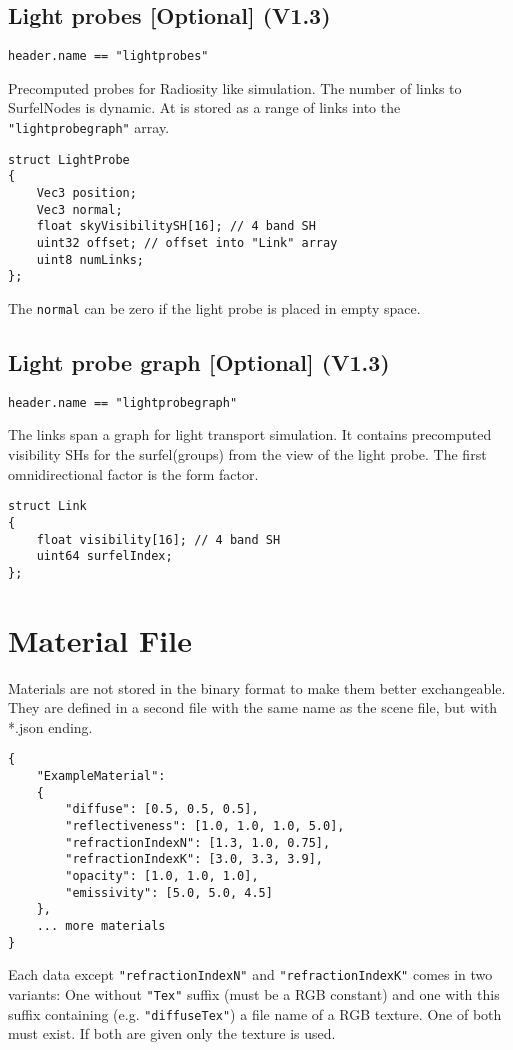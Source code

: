 \documentclass[english,10pt,a4paper,twocolumn,colorscheme=green]{orarticle}
\begin{document}
	\subsection{Light probes [Optional] (V1.3)}
	\lstinline|header.name == "lightprobes"|
	
	Precomputed probes for Radiosity like simulation. The number of links to SurfelNodes is dynamic. At is stored as a range of links into the \lstinline|"lightprobegraph"| array.
	
\begin{lstlisting}
struct LightProbe
{
	Vec3 position;
	Vec3 normal;
	float skyVisibilitySH[16]; // 4 band SH
	uint32 offset; // offset into "Link" array
	uint8 numLinks;
};
\end{lstlisting}

	The \lstinline|normal| can be zero if the light probe is placed in empty space.
		
	\subsection{Light probe graph [Optional] (V1.3)}
	\lstinline|header.name == "lightprobegraph"|
	
	The links span a graph for light transport simulation. It contains precomputed visibility SHs for the surfel(groups) from the view of the light probe. The first omnidirectional factor is the form factor. 
\begin{lstlisting}
struct Link
{
	float visibility[16]; // 4 band SH
	uint64 surfelIndex;
};
\end{lstlisting}
	
	\section{Material File}
	\label{sec:materialjson}
	Materials are not stored in the binary format to make them better exchangeable. They are defined in a second file with the same name as the scene file, but with *.json ending.
	\begin{lstlisting}
{
  	"ExampleMaterial": 
  	{
		"diffuse": [0.5, 0.5, 0.5],
		"reflectiveness": [1.0, 1.0, 1.0, 5.0],
		"refractionIndexN": [1.3, 1.0, 0.75],
		"refractionIndexK": [3.0, 3.3, 3.9],
		"opacity": [1.0, 1.0, 1.0],
		"emissivity": [5.0, 5.0, 4.5]
  	},		
	... more materials
}
	\end{lstlisting}
	Each data except \lstinline|"refractionIndexN"| and \lstinline|"refractionIndexK"| comes in two variants: One without \lstinline|"Tex"| suffix (must be a RGB constant) and one with this suffix containing (e.g. \lstinline|"diffuseTex"|) a file name of a RGB texture. One of both must exist. If both are given only the texture is used.
	
\end{document}
